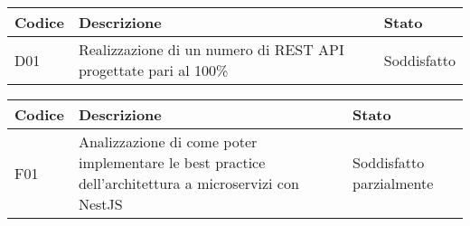 \leavevmode\newline
\begin{table}
    \begin{tabular}{|p{1.5cm}|p{7.7cm}|p{2cm}|} 
    \hline
    \textbf{Codice} & \textbf{Descrizione} & \textbf{Stato} \\ 
    \hline
    D01 & Realizzazione di un numero di REST API progettate pari al 100\%  & Soddisfatto \\
    \hline
    \end{tabular}
\end{table}

\leavevmode\newline
\begin{table}
    \begin{tabular}{|p{1.5cm}|p{7.7cm}|p{2cm}|} 
    \hline
    \textbf{Codice} & \textbf{Descrizione} & \textbf{Stato} \\ 
    \hline
    F01 & Analizzazione di come poter implementare le best practice dell'architettura a microservizi con NestJS & Soddisfatto parzialmente \\
    \hline
    \end{tabular}
\end{table}

